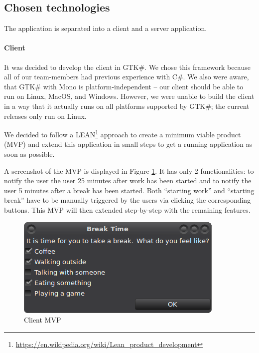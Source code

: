 \subsection{Chosen technologies}
The application is separated into a client and a server application.



\paragraph{Client} It was decided to develop the client in GTK\#. We chose this framework because all of our 
team-members had previous experience with C\#. We also were aware, that GTK\# with Mono is platform-independent -- our 
client should be able to run on Linux, MacOS, and Windows. However, we were unable to build the client in a way that 
it actually runs on all platforms supported by GTK\#; the current releases only run on Linux.

We decided to follow a LEAN\footnote{\url{https://en.wikipedia.org/wiki/Lean_product_development}} approach to create 
a minimum viable product (MVP) and extend this application in small steps to get a running application as soon as 
possible.

A screenshot of the MVP is displayed in Figure \ref{fig:mvp-screenshot}. It has only 2 functionalities: to notify the 
user the user 25 minutes after work has been started and to notify the user 5 minutes after a break has been started. 
Both ``starting work'' and ``starting break'' have to be manually triggered by the users via clicking the 
corresponding buttons. This MVP will then extended step-by-step with the remaining features.

\begin{figure}
  \centering
  \includegraphics{images/mvp-screenshot.png}
  \caption{Client MVP}
  \label{fig:mvp-screenshot}
\end{figure}

